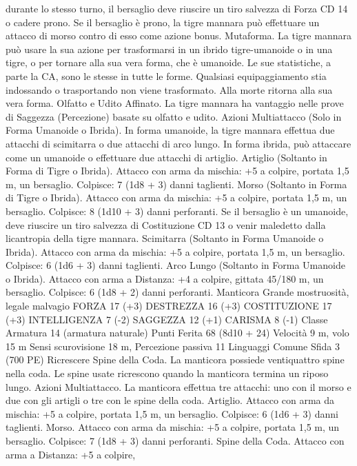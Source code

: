\begin{multicols}{2}
durante lo stesso turno, il bersaglio deve riuscire un tiro salvezza
di Forza CD 14 o cadere prono. Se il bersaglio è prono, la tigre
mannara può effettuare un attacco di morso contro di esso come
azione bonus.
Mutaforma. La tigre mannara può usare la sua azione per
trasformarsi in un ibrido tigre-umanoide o in una tigre, o per
tornare alla sua vera forma, che è umanoide. Le sue statistiche, a
parte la CA, sono le stesse in tutte le forme. Qualsiasi
equipaggiamento stia indossando o trasportando non viene
trasformato. Alla morte ritorna alla sua vera forma.
Olfatto e Udito Affinato. La tigre mannara ha vantaggio nelle
prove di Saggezza (Percezione) basate su olfatto e udito.
Azioni
Multiattacco (Solo in Forma Umanoide o Ibrida). In forma
umanoide, la tigre mannara effettua due attacchi di scimitarra o
due attacchi di arco lungo. In forma ibrida, può attaccare come
un umanoide o effettuare due attacchi di artiglio.
Artiglio (Soltanto in Forma di Tigre o Ibrida). Attacco con
arma da mischia: +5 a colpire, portata 1,5 m, un bersaglio.
Colpisce: 7 (1d8 + 3) danni taglienti.
Morso (Soltanto in Forma di Tigre o Ibrida). Attacco con arma
da mischia: +5 a colpire, portata 1,5 m, un bersaglio.
Colpisce: 8 (1d10 + 3) danni perforanti. Se il bersaglio è un
umanoide, deve riuscire un tiro salvezza di Costituzione CD 13 o
venir maledetto dalla licantropia della tigre mannara.
Scimitarra (Soltanto in Forma Umanoide o Ibrida). Attacco
con arma da mischia: +5 a colpire, portata 1,5 m, un bersaglio.
Colpisce: 6 (1d6 + 3) danni taglienti.
Arco Lungo (Soltanto in Forma Umanoide o Ibrida). Attacco
con arma a Distanza: +4 a colpire, gittata 45/180 m, un
bersaglio.
Colpisce: 6 (1d8 + 2) danni perforanti.
Manticora
Grande mostruosità, legale malvagio
FORZA 17 (+3)
DESTREZZA 16 (+3)
COSTITUZIONE 17 (+3)
INTELLIGENZA 7 (-2)
SAGGEZZA 12 (+1)
CARISMA 8 (-1)
Classe Armatura 14 (armatura naturale)
Punti Ferita 68 (8d10 + 24)
Velocità 9 m, volo 15 m
Sensi scurovisione 18 m, Percezione passiva 11
Linguaggi Comune
Sfida 3 (700 PE)
Ricrescere Spine della Coda. La manticora possiede ventiquattro
spine nella coda. Le spine usate ricrescono quando la manticora
termina un riposo lungo.
Azioni
Multiattacco. La manticora effettua tre attacchi: uno con il
morso e due con gli artigli o tre con le spine della coda.
Artiglio. Attacco con arma da mischia: +5 a colpire, portata 1,5
m, un bersaglio.
Colpisce: 6 (1d6 + 3) danni taglienti.
Morso. Attacco con arma da mischia: +5 a colpire, portata 1,5
m, un bersaglio.
Colpisce: 7 (1d8 + 3) danni perforanti.
Spine della Coda. Attacco con arma a Distanza: +5 a colpire,

\end{multicols}
